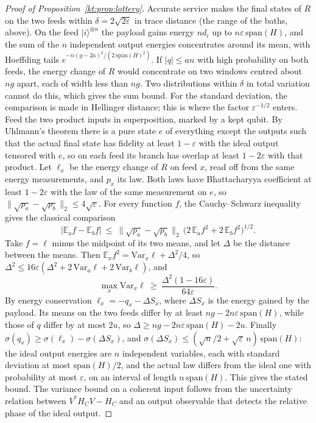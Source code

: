 \begin{proof}[Proof of Proposition~\ref{kt:prop:lottery}]
Accurate service makes the final states of $R$ on the two feeds within $\delta=2\sqrt{2\varepsilon}$ in trace distance (the range of the baths, above). On the feed $|i\rangle^{\otimes n}$ the payload gains energy $nd_i$ up to $n\varepsilon\,\mathrm{span}(H)$, and the sum of the $n$ independent output energies concentrates around its mean, with Hoeffding tails $e^{-n(g-2a)^2/(2\,\mathrm{span}(H)^2)}$. If $|q|\le an$ with high probability on both feeds, the energy change of $R$ would concentrate on two windows centred about $ng$ apart, each of width less than $ng$. Two distributions within $\delta$ in total variation cannot do this, which gives the sum bound. For the standard deviation, the comparison is made in Hellinger distance; this is where the factor $\varepsilon^{-1/2}$ enters. Feed the two product inputs in superposition, marked by a kept qubit. By Uhlmann's theorem there is a pure state $e$ of everything except the outputs such that the actual final state has fidelity at least $1-\varepsilon$ with the ideal output tensored with $e$, so on each feed its branch has overlap at least $1-2\varepsilon$ with that product. Let $\ell_x$ be the energy change of $R$ on feed $x$, read off from the same energy measurements, and $p_x$ its law. Both laws have Bhattacharyya coefficient at least $1-2\varepsilon$ with the law of the same measurement on $e$, so $\|\sqrt{p_a}-\sqrt{p_b}\|_2\le4\sqrt\varepsilon$. For every function $f$, the Cauchy--Schwarz inequality gives the classical comparison
\[
|\mathbb E_af-\mathbb E_bf|\ \le\ \|\sqrt{p_a}-\sqrt{p_b}\|_2\,\bigl(2\,\mathbb E_af^2+2\,\mathbb E_bf^2\bigr)^{1/2}.
\]
Take $f=\ell$ minus the midpoint of its two means, and let $\Delta$ be the distance between the means. Then $\mathbb E_xf^2=\mathrm{Var}_x\ell+\Delta^2/4$, so $\Delta^2\le16\varepsilon(\Delta^2+2\,\mathrm{Var}_a\ell+2\,\mathrm{Var}_b\ell)$, and
\[
\max_x\mathrm{Var}_x\ell\ \ge\ \frac{\Delta^2(1-16\varepsilon)}{64\varepsilon}.
\]
By energy conservation $\ell_x=-q_x-\Delta S_x$, where $\Delta S_x$ is the energy gained by the payload. Its means on the two feeds differ by at least $ng-2n\varepsilon\,\mathrm{span}(H)$, while those of $q$ differ by at most $2u$, so $\Delta\ge ng-2n\varepsilon\,\mathrm{span}(H)-2u$. Finally $\sigma(q_x)\ge\sigma(\ell_x)-\sigma(\Delta S_x)$, and $\sigma(\Delta S_x)\le(\sqrt n/2+\sqrt\varepsilon\,n)\,\mathrm{span}(H)$: the ideal output energies are $n$ independent variables, each with standard deviation at most $\mathrm{span}(H)/2$, and the actual law differs from the ideal one with probability at most $\varepsilon$, on an interval of length $n\,\mathrm{span}(H)$. This gives the stated bound. The variance bound on a coherent input follows from the uncertainty relation between $V^*H_CV-H_C$ and an output observable that detects the relative phase of the ideal output.
\end{proof}

